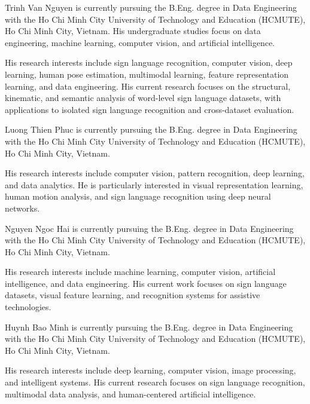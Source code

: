 \documentclass{ieeeaccess}
\begin{document}
\begin{IEEEbiographynophoto}{Trinh Van Nguyen}
is currently pursuing the B.Eng. degree in Data Engineering with the Ho Chi
Minh City University of Technology and Education (HCMUTE), Ho Chi Minh City,
Vietnam. His undergraduate studies focus on data engineering, machine learning,
computer vision, and artificial intelligence.

His research interests include sign language recognition, computer vision, deep
learning, human pose estimation, multimodal learning, feature representation
learning, and data engineering. His current research focuses on the structural,
kinematic, and semantic analysis of word-level sign language datasets, with
applications to isolated sign language recognition and cross-dataset
evaluation.
\end{IEEEbiographynophoto}

\begin{IEEEbiographynophoto}{Luong Thien Phuc}
is currently pursuing the B.Eng. degree in Data Engineering with the Ho Chi Minh
City University of Technology and Education (HCMUTE), Ho Chi Minh City,
Vietnam.

His research interests include computer vision, pattern recognition, deep
learning, and data analytics. He is particularly interested in visual
representation learning, human motion analysis, and sign language recognition
using deep neural networks.
\end{IEEEbiographynophoto}

\begin{IEEEbiographynophoto}{Nguyen Ngoc Hai}
is currently pursuing the B.Eng. degree in Data Engineering with the Ho Chi Minh
City University of Technology and Education (HCMUTE), Ho Chi Minh City,
Vietnam.

His research interests include machine learning, computer vision, artificial
intelligence, and data engineering. His current work focuses on sign language
datasets, visual feature learning, and recognition systems for assistive
technologies.
\end{IEEEbiographynophoto}

\begin{IEEEbiographynophoto}{Huynh Bao Minh}
is currently pursuing the B.Eng. degree in Data Engineering with the Ho Chi Minh
City University of Technology and Education (HCMUTE), Ho Chi Minh City,
Vietnam.

His research interests include deep learning, computer vision, image
processing, and intelligent systems. His current research focuses on sign
language recognition, multimodal data analysis, and human-centered artificial
intelligence.
\end{IEEEbiographynophoto}
\end{document}
